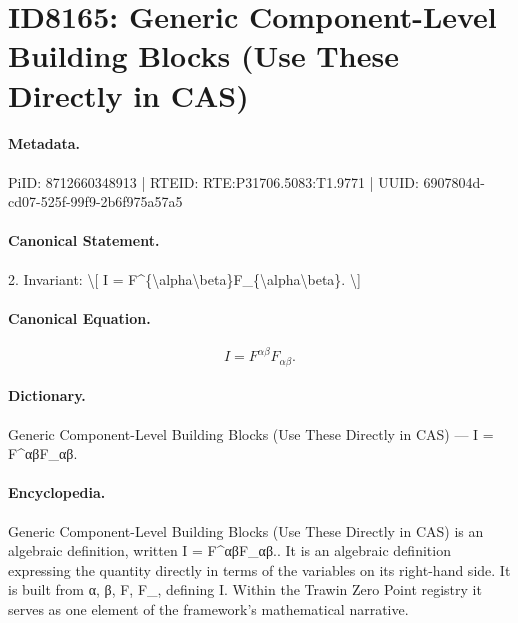 \section*{ID8165: Generic Component-Level Building Blocks (Use These Directly in CAS)}
\paragraph{Metadata.}
PiID: 8712660348913 | RTEID: RTE:P31706.5083:T1.9771 | UUID: 6907804d-cd07-525f-99f9-2b6f975a57a5

\paragraph{Canonical Statement.}
2. Invariant: \textbackslash{}[ I = F\textasciicircum{}\{\textbackslash{}alpha\textbackslash{}beta\}F\_\{\textbackslash{}alpha\textbackslash{}beta\}. \textbackslash{}]

\paragraph{Canonical Equation.}
\[
I = F^{\alpha\beta}F_{\alpha\beta}.
\]

\paragraph{Dictionary.}
Generic Component-Level Building Blocks (Use These Directly in CAS) — I = F\textasciicircum{}αβF\_αβ.

\paragraph{Encyclopedia.}
Generic Component-Level Building Blocks (Use These Directly in CAS) is an algebraic definition, written I = F\textasciicircum{}αβF\_αβ.. It is an algebraic definition expressing the quantity directly in terms of the variables on its right-hand side. It is built from α, β, F, F\_, defining I. Within the Trawin Zero Point registry it serves as one element of the framework's mathematical narrative.
